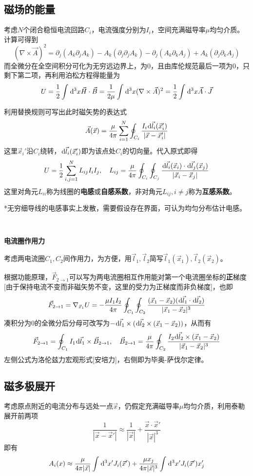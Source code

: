 \documentclass[a4paper,UTF8,fontset=windows]{ctexart}
\newcommand*{\dr}{\hspace{0.07em}\mathrm{d}}
\newcommand*{\va}{\vec{A}}
\newcommand*{\vb}{\vec{B}}
\newcommand*{\vf}{\vec{F}}
\newcommand*{\vh}{\vec{H}}
\newcommand*{\vj}{\vec{J}}
\newcommand*{\vls}{\vec{l}}
\newcommand*{\vx}{\vec{x}}
\begin{document}
\subsection{磁场的能量}
考虑$N$个闭合稳恒电流回路$C_i$，电流强度分别为$I_i$，空间充满磁导率$\mu$均匀介质。计算可得到
$$(\nabla\times\va)^2=\partial_j(A_k\partial_jA_k)-A_k(\partial_j\partial_jA_k)-\partial_j(A_k\partial_kA_j)+A_k(\partial_j\partial_kA_j)$$
而全微分在全空间积分可化为无穷远边界上，为0，且由库伦规范最后一项为0，只剩下第二项，再利用泊松方程得能量为
$$U=\frac{1}{2}\int\dr^3x\vh\cdot\vb=\frac{1}{2\mu}\int\dr^3x(\nabla\times\va)^2=\frac{1}{2}\int\dr^3x\va\cdot\vj$$

利用替换规则可写出此时磁矢势的表达式
$$\va(\vx)=\frac{\mu}{4\pi}\sum_{i=1}^N\oint_{C_i}\frac{I_i\dr\vls_i(\vx_i')}{|\vx-\vx_i'|}$$
这里$\vx_i'$沿$C_i$绕转，$\dr\vls_i(\vx_i')$即为该点处$C_i$的切向量。代入原式即得
$$U=\frac{1}{2}\sum_{i,j=1}^NL_{ij}I_iI_j,\quad L_{ij}=\frac{\mu}{4\pi}\oint_{C_i}\oint_{C_j}\frac{\dr\vls_i(\vx_i)\cdot\dr\vls_j(\vx_j)}{|\vx_i-\vx_j|}$$
这里对角元$L_{ii}$称为线圈的\textbf{电感}或\textbf{自感系数}，非对角元$L_{ij},i\ne j$称为\textbf{互感系数}。

*无穷细导线的电感事实上发散，需要假设存在界面，可认为均匀分布估计电感。

\

\textbf{电流圈作用力}

考虑两电流圈$C_1,C_2$间作用力，为方便，用$\vls_1,\vls_2$简写$\vls_1(\vx_1),\vls_2(\vx_2)$。

根据功能原理，$\vf_{2\to1}$可以写为两电流圈相互作用能对第一个电流圈坐标的\textbf{正}梯度[由于保持电流不变而非磁矢势不变，这里的受力为正梯度而非负梯度]，也即
$$\vf_{2\to1}=\nabla_{\vx_1}U=-\frac{\mu I_1I_2}{4\pi}\oint_{C_1}\oint_{C_2}\frac{(\vx_1-\vx_2)(\dr\vls_1\cdot\dr\vls_2)}{|\vx_1-\vx_2|^3}$$
凑积分为0的全微分后分母可改写为$-\dr\vls_1\times(\dr\vls_2\times(\vx_1-\vx_2))$，从而有
$$\vf_{2\to1}=\oint_{C_1}I_1\dr\vls_1\times\vb_{2\to1},\quad\vb_{2\to1}=\frac{\mu}{4\pi}\oint_{C_2}\frac{I_2\dr\vls_2\times(\vx_1-\vx_2)}{|\vx_1-\vx_2|^3}$$
左侧公式为洛伦兹力宏观形式[安培力]，右侧即为毕奥-萨伐尔定律。

\subsection{磁多极展开}
考虑原点附近的电流分布与远处一点$\vx$，仍假定充满磁导率$\mu$均匀介质，利用泰勒展开前两项
$$\frac{1}{|\vx-\vx'|}\approx\frac{1}{|\vx|}+\frac{\vx\cdot\vx'}{|\vx|^3}$$
即有
$$A_i(x)\approx\frac{\mu}{4\pi|\vx|}\int\dr^3x'J_i(\vx')+\frac{\mu x_j}{4\pi|\vx|^3}\int\dr^3x'J_i(\vx')x_j'$$
\end{document}
